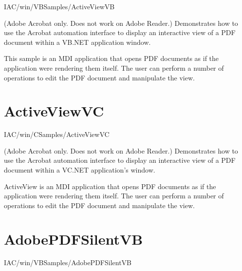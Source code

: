 \documentclass[letterpaper,12pt,english,openany,oneside]{sphinxmanual}
\begin{document}
IAC/win/VBSamples/ActiveViewVB

\label{\detokenize{Samples_WindowsIAC:description-2}}

(Adobe Acrobat only. Does not work on Adobe Reader.) Demonstrates how to use the Acrobat automation interface to display an interactive view of a PDF document within a VB.NET application window.

\label{\detokenize{Samples_WindowsIAC:usage-2}}

This sample is an MDI application that opens PDF documents as if the application were rendering them itself. The user can perform a number of operations to edit the PDF document and manipulate the view.


\section{ActiveViewVC}
\label{\detokenize{Samples_WindowsIAC:activeviewvc}}\label{\detokenize{Samples_WindowsIAC:location-3}}

IAC/win/CSamples/ActiveViewVC

\label{\detokenize{Samples_WindowsIAC:description-3}}

(Adobe Acrobat only. Does not work on Adobe Reader.) Demonstrates how to use the Acrobat automation interface to display an interactive view of a PDF document within a VC.NET application’s window.

\label{\detokenize{Samples_WindowsIAC:usage-3}}

ActiveView is an MDI application that opens PDF documents as if the application were rendering them itself. The user can perform a number of operations to edit the PDF document and manipulate the view.


\section{AdobePDFSilentVB}
\label{\detokenize{Samples_WindowsIAC:adobepdfsilentvb}}\label{\detokenize{Samples_WindowsIAC:location-4}}

IAC/win/VBSamples/AdobePDFSilentVB

\label{\detokenize{Samples_WindowsIAC:description-4}}
\end{document}
